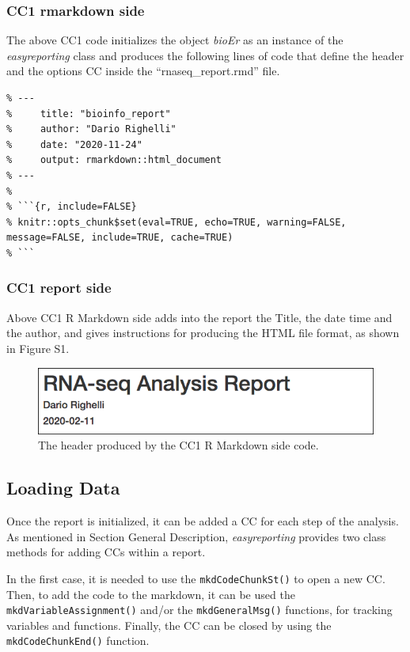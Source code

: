 \documentclass[]{article}
\begin{document}
\hypertarget{cc1-rmarkdown-side}{%
\subsubsection{CC1 rmarkdown side}\label{cc1-rmarkdown-side}}

The above CC1 code initializes the object \emph{bioEr} as an instance of
the \emph{easyreporting} class and produces the following lines of code
that define the header and the options CC inside the
``rnaseq\_report.rmd'' file.

\begin{verbatim}
% ---
%     title: "bioinfo_report"
%     author: "Dario Righelli"
%     date: "2020-11-24"
%     output: rmarkdown::html_document
% ---
% 
% ```{r, include=FALSE}
% knitr::opts_chunk$set(eval=TRUE, echo=TRUE, warning=FALSE, message=FALSE, include=TRUE, cache=TRUE)
% ```
\end{verbatim}

\hypertarget{cc1-report-side}{%
\subsubsection{CC1 report side}\label{cc1-report-side}}

Above CC1 R Markdown side adds into the report the Title, the date time
and the author, and gives instructions for producing the HTML file
format, as shown in Figure S1.

\begin{figure}
\centering
\includegraphics{imgs/1.png}
\caption{The header produced by the CC1 R Markdown side code.}
\end{figure}

\hypertarget{loading-data}{%
\subsection{Loading Data}\label{loading-data}}

Once the report is initialized, it can be added a CC for each step of
the analysis. As mentioned in Section General Description,
\emph{easyreporting} provides two class methods for adding CCs within a
report.

In the first case, it is needed to use the \texttt{mkdCodeChunkSt()} to
open a new CC. Then, to add the code to the markdown, it can be used the
\texttt{mkdVariableAssignment()} and/or the \texttt{mkdGeneralMsg()}
functions, for tracking variables and functions. Finally, the CC can be
closed by using the \texttt{mkdCodeChunkEnd()} function.
\end{document}
